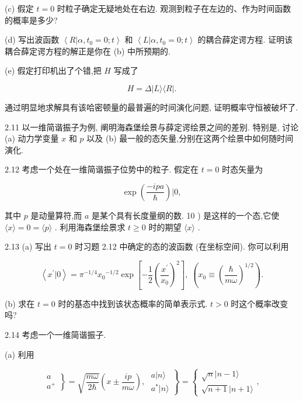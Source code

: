 (c) 假定 $t = 0$ 时粒子确定无疑地处在右边. 观测到粒子在左边的、作为时间函数的概率是多少?

(d) 写出波函数 $\left\langle {R | \alpha ,{t}_{0} = 0;t}\right\rangle$ 和 $\left\langle {L | \alpha ,{t}_{0} = 0;t}\right\rangle$ 的耦合薛定谔方程. 证明该耦合薛定谔方程的解正是你在 (b) 中所预期的.

(e) 假定打印机出了个错,把 $H$ 写成了

$$
H = \Delta \left| {L\rangle \langle R}\right| .
$$

通过明显地求解具有该哈密顿量的最普遍的时间演化问题, 证明概率守恒被破坏了.

2.11 以一维简谐振子为例, 阐明海森堡绘景与薛定谔绘景之间的差别. 特别是, 讨论 (a) 动力学变量 $x$ 和 $p$ 以及 (b) 最一般的态矢量,分别在这两个绘景中如何随时间演化.

2.12 考虑一个处在一维简谐振子位势中的粒子. 假定在 $t = 0$ 时态矢量为

$$
\exp \left( \frac{-{ipa}}{\hbar }\right) | 0,
$$

其中 $p$ 是动量算符,而 $a$ 是某个具有长度量纲的数. 10 ) 是这样的一个态,它使 $\langle x\rangle = 0 = \langle p\rangle$ . 利用海森堡绘景求 $t \geq 0$ 时的期望 $\langle x\rangle$ .

2.13 (a) 写出 $t = 0$ 时习题 2.12 中确定的态的波函数 (在坐标空间). 你可以利用

$$
\left\langle {{x}^{\prime } | 0}\right\rangle = {\pi }^{-1/4}{x}_{0}{}^{-1/2}\exp \left\lbrack {-\frac{1}{2}{\left( \frac{{x}^{\prime }}{{x}_{0}}\right) }^{2}}\right\rbrack ,\;\left( {{x}_{0} \equiv {\left( \frac{\hbar }{m\omega }\right) }^{1/2}}\right) .
$$

(b) 求在 $t = 0$ 时的基态中找到该状态概率的简单表示式. $t > 0$ 时这个概率改变吗?

2.14 考虑一个一维简谐振子.

(a) 利用

$$
\left. \begin{array}{l} a \\ {a}^{ + } \end{array}\right\} = \sqrt{\frac{m\omega }{2\hbar }}\left( {x \pm \frac{ip}{m\omega }}\right) ,\;\left. \begin{array}{l} a | n\rangle \\ {a}^{ * } | n\rangle \end{array}\right\} = \left\{ {\begin{array}{l} \sqrt{n} | n - 1\rangle \\ \sqrt{n + 1} | n + 1\rangle \end{array},}\right.
$$

